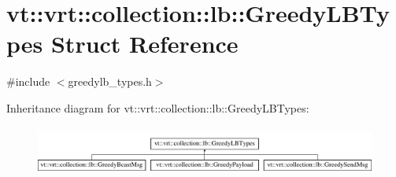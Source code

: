 \hypertarget{structvt_1_1vrt_1_1collection_1_1lb_1_1_greedy_l_b_types}{}\section{vt\+:\+:vrt\+:\+:collection\+:\+:lb\+:\+:Greedy\+L\+B\+Types Struct Reference}
\label{structvt_1_1vrt_1_1collection_1_1lb_1_1_greedy_l_b_types}


{\ttfamily \#include $<$greedylb\+\_\+types.\+h$>$}

Inheritance diagram for vt\+:\+:vrt\+:\+:collection\+:\+:lb\+:\+:Greedy\+L\+B\+Types\+:\begin{figure}[H]
\begin{center}
\leavevmode
\includegraphics[height=1.623188cm]{structvt_1_1vrt_1_1collection_1_1lb_1_1_greedy_l_b_types}
\end{center}
\end{figure}
